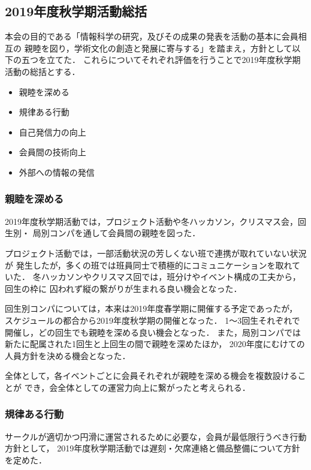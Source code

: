 \subsection*{2019年度秋学期活動総括}


本会の目的である「情報科学の研究，及びその成果の発表を活動の基本に会員相互の
親睦を図り，学術文化の創造と発展に寄与する」を踏まえ，方針として以下の五つを立てた．
これらについてそれぞれ評価を行うことで2019年度秋学期活動の総括とする．

\begin{itemize}
    \item 親睦を深める
    \item 規律ある行動
    \item 自己発信力の向上
    \item 会員間の技術向上
    \item 外部への情報の発信
\end{itemize}

\subsubsection*{親睦を深める}
2019年度秋学期活動では，プロジェクト活動や冬ハッカソン，クリスマス会，回生別・
局別コンパを通して会員間の親睦を図った．

プロジェクト活動では，一部活動状況の芳しくない班で連携が取れていない状況が
発生したが，多くの班では班員同士で積極的にコミュニケーションを取れていた．
冬ハッカソンやクリスマス回では，班分けやイベント構成の工夫から，回生の枠に
囚われず縦の繋がりが生まれる良い機会となった．

回生別コンパについては，本来は2019年度春学期に開催する予定であったが，
スケジュールの都合から2019年度秋学期の開催となった．
1〜3回生それぞれで開催し，どの回生でも親睦を深める良い機会となった．
また，局別コンパでは新たに配属された1回生と上回生の間で親睦を深めたほか，
2020年度にむけての人員方針を決める機会となった．

全体として，各イベントごとに会員それぞれが親睦を深める機会を複数設けることが
でき，会全体としての運営力向上に繋がったと考えられる．

\subsubsection*{規律ある行動}
サークルが適切かつ円滑に運営されるために必要な，会員が最低限行うべき行動方針として，
2019年度秋学期活動では遅刻・欠席連絡と備品整備について方針を定めた．

